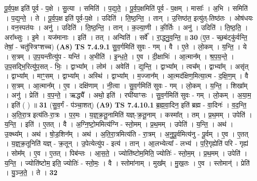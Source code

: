 \documentclass[17pt]{extarticle}
\begin{document}
                  पू॒र्व॒प॒क्ष इति॑ पूर्व - प॒क्षे । सु॒त्या । समिति॑ । प॒द्य॒ते॒ । पू॒र्व॒प॒क्षमिति॑ पूर्व - प॒क्षम् । मासाः᳚ । अ॒भि । समिति॑ । प॒द्य॒न्ते॒ । ते । पू॒र्व॒प॒क्ष इति॑ पूर्व-प॒क्षे । उदिति॑ । ति॒ष्ठ॒न्ति॒ । तान् । उ॒त्तिष्ठ॑त॒ इत्यु॑त्-तिष्ठ॑तः । ओष॑धयः । वन॒स्पत॑यः । अनु॑ । उदिति॑ । ति॒ष्ठ॒न्ति॒ । तान् । क॒ल्या॒णी । की॒र्तिः । अनु॑ । उदिति॑ । ति॒ष्ठ॒ति॒ । अरा᳚थ्सुः । इ॒मे । यज॑मानाः । इति॑ । तत् । अन्विति॑ । सर्वे᳚ । रा॒द्ध्नु॒व॒न्ति॒ ॥ \textbf{  30} \newline
                  \newline
                      (ए॒त - च्छ॒बंट्कु॑र्वन्ति॒ तेषां॒ - चतु॑स्त्रिꣳशच्च)  \textbf{(A8)} \newline \newline
                                \textbf{ TS 7.4.9.1} \newline
                  सु॒व॒र्गमिति॑ सुवः - गम् । वै । ए॒ते । लो॒कम् । य॒न्ति॒ । ये । स॒त्रम् । उ॒प॒यन्तीत्यु॑प - यन्ति॑ । अ॒भीति॑ । इ॒न्ध॒ते॒ । ए॒व । दी॒क्षाभिः॑ । आ॒त्मान᳚म् । श्र॒प॒य॒न्ते॒ । उ॒प॒सद्भि॒रित्यु॑प॒सत् - भिः॒ । द्वाभ्या᳚म् । लोम॑ । अवेति॑ । द्य॒न्ति॒ । द्वाभ्या᳚म् । त्वच᳚म् । द्वाभ्या᳚म् । असृ॑त् । द्वाभ्या᳚म् । माꣳ॒॒सम् । द्वाभ्या᳚म् । अस्थि॑ । द्वाभ्या᳚म् । म॒ज्जान᳚म् । आ॒त्मद॑क्षिण॒मित्या॒त्म - द॒क्षि॒ण॒म् । वै । स॒त्रम् । आ॒त्मान᳚म् । ए॒व । दक्षि॑णाम् । नी॒त्वा । सु॒व॒र्गमिति॑ सुवः - गम् । लो॒कम् । य॒न्ति॒ । शिखा᳚म् । अनु॑ । प्रेति॑ । व॒प॒न्ते॒ । ऋद्ध्यै᳚ । अथो॒ इति॑ । रघी॑याꣳसः । सु॒व॒र्गमिति॑ सुवः - गम् । लो॒कम् । अ॒या॒म॒ । इति॑ ( ) ॥ \textbf{  31 } \newline
                  \newline
                      (सु॒व॒र्गं - प॑ञ्चा॒शत्)  \textbf{(A9)} \newline \newline
                                \textbf{ TS 7.4.10.1} \newline
                  ब्र॒ह्म॒वा॒दिन॒ इति॑ ब्रह्म - वा॒दिनः॑ । व॒द॒न्ति॒ । अ॒ति॒रा॒त्र इत्य॑ति-रा॒त्रः । प॒र॒मः । य॒ज्ञ्॒क्र॒तू॒नामिति॑ यज्ञ्-क्र॒तू॒नाम् । कस्मा᳚त् । तम् । प्र॒थ॒मम् । उपेति॑ । य॒न्ति॒ । इति॑ । ए॒तत् । वै । अ॒ग्नि॒ष्टो॒ममित्य॑ग्नि - स्तो॒मम् । प्र॒थ॒मम् । उपेति॑ । य॒न्ति॒ । अथ॑ । उ॒क्थ्य᳚म् । अथ॑ । षो॒ड॒शिन᳚म् । अथ॑ । अ॒ति॒रा॒त्रमित्य॑ति - रा॒त्रम् । अ॒नु॒पू॒र्वमित्य॑नु - पू॒र्वम् । ए॒व । ए॒तत् । य॒ज्ञ्॒क्र॒तूनिति॑ यज्ञ् - क्र॒तून् । उ॒पेत्येत्यु॑प - इत्य॑ । तान् । आ॒लभ्येत्या᳚ - लभ्य॑ । प॒रि॒गृह्येति॑ परि - गृह्य॑ । सोम᳚म् । ए॒व । ए॒तत् । पिब॑न्तः । आ॒स॒ते॒ । ज्योति॑ष्टोम॒मिति॒ ज्योतिः॑ - स्तो॒म॒म् । प्र॒थ॒मम् । उपेति॑ । य॒न्ति॒ । ज्योति॑ष्टोम॒ इति॒ ज्योतिः॑ - स्तो॒मः॒ । वै । स्तोमा॑नाम् । मुख᳚म् । मु॒ख॒तः । ए॒व । स्तोमान्॑ । प्रेति॑ । यु॒ञ्ज॒ते॒ । ते । \textbf{  32} \newline
\end{document}
